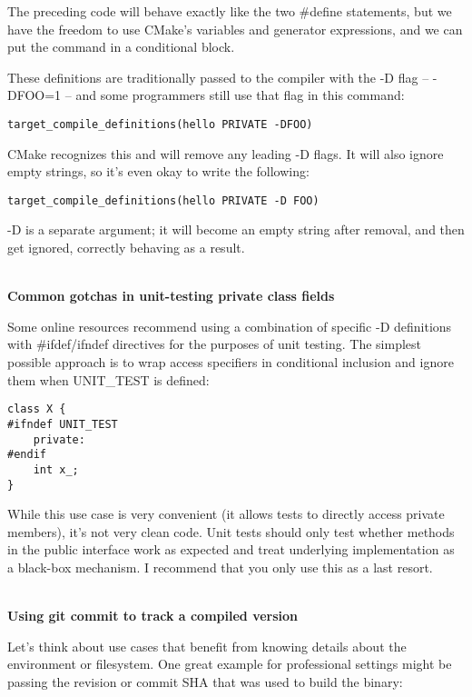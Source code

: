 The preceding code will behave exactly like the two \#define statements, but we have the freedom to use CMake's variables and generator expressions, and we can put the command in a conditional block.

\begin{tcolorbox}[colback=blue!5!white,colframe=blue!75!black,title=Important Note]
These definitions are traditionally passed to the compiler with the -D flag – -DFOO=1 – and some programmers still use that flag in this command:
\begin{lstlisting}[style=styleCMake]
target_compile_definitions(hello PRIVATE -DFOO)
\end{lstlisting}  
CMake recognizes this and will remove any leading -D flags. It will also ignore empty strings, so it's even okay to write the following:
\begin{lstlisting}[style=styleCMake]
target_compile_definitions(hello PRIVATE -D FOO)
\end{lstlisting}   
-D is a separate argument; it will become an empty string after removal, and then get ignored, correctly behaving as a result.
\end{tcolorbox}

\hspace*{\fill} \\ %
\noindent
\textbf{Common gotchas in unit-testing private class fields}

Some online resources recommend using a combination of specific -D definitions with \#ifdef/ifndef directives for the purposes of unit testing. The simplest possible approach is to wrap access specifiers in conditional inclusion and ignore them when UNIT\_TEST is defined:

\begin{lstlisting}[style=styleCXX]
class X {
#ifndef UNIT_TEST
	private:
#endif
	int x_;
}
\end{lstlisting}

While this use case is very convenient (it allows tests to directly access private members), it's not very clean code. Unit tests should only test whether methods in the public interface work as expected and treat underlying implementation as a black-box mechanism. I recommend that you only use this as a last resort.

\hspace*{\fill} \\ %
\noindent
\textbf{Using git commit to track a compiled version}

Let's think about use cases that benefit from knowing details about the environment or filesystem. One great example for professional settings might be passing the revision or commit SHA that was used to build the binary:

